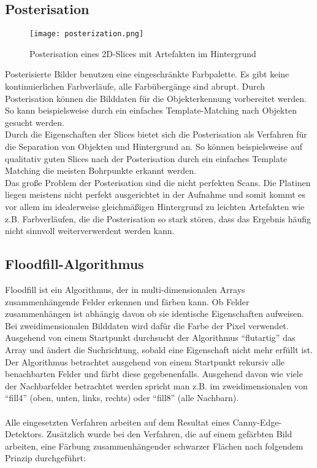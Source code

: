 \subsection {Posterisation}
\begin{figure}[H]
  \begin{center}
    \texttt{[image: posterization.png]}
    \caption{Posterisation eines 2D-Slices mit Artefakten im Hintergrund}
    \label{fig:posterization1}
  \end{center}
\end{figure}

Posterisierte Bilder benutzen eine eingeschränkte Farbpalette. Es gibt keine kontinuierlichen Farbverläufe, alle Farbübergänge sind abrupt. Durch Posterisation können die Bilddaten für die Objekterkennung vorbereitet werden. So kann beispielsweise durch ein einfaches Template-Matching nach Objekten gesucht werden. \\
Durch die Eigenschaften der Slices bietet sich die Posterisation als Verfahren für die Separation von Objekten und Hintergrund an. So können beispielsweise auf qualitativ guten Slices nach der Posterisation durch ein einfaches Template Matching die meisten Bohrpunkte erkannt werden. \\
Das große Problem der Posterisation sind die nicht perfekten Scans. Die Platinen liegen meistens nicht perfekt ausgerichtet in der Aufnahme und somit kommt es vor allem im idealerweise gleichmäßigen Hintergrund zu leichten Artefakten wie z.B. Farbverläufen, die die Posterisation so stark stören, dass das Ergebnis häufig nicht sinnvoll weiterverwerdent werden kann.

	\subsection {Floodfill-Algorithmus}
Floodfill ist ein Algorithmus, der in multi-dimensionalen Arrays zusammenhängende Felder erkennen und färben kann. Ob Felder zusammenhängen ist abhängig davon ob sie identische Eigenschaften aufweisen. Bei zweidimensionalen Bilddaten wird dafür die Farbe der Pixel verwendet. Ausgehend von einem Startpunkt durchsucht der Algorithmus “flutartig” das Array und ändert die Suchrichtung, sobald eine Eigenschaft nicht mehr erfüllt ist. \\
Der Algorithmus betrachtet ausgehend von einem Startpunkt rekursiv alle benachbarten Felder und färbt diese gegebenenfalls. Ausgehend davon wie viele der Nachbarfelder betrachtet werden spricht man z.B. im zweidimensionalen von “fill4” (oben, unten, links, rechts) oder “fill8” (alle Nachbarn). \\ \\
Alle eingesetzten Verfahren arbeiten auf dem Resultat eines Canny-Edge-Detektors. Zusätzlich wurde bei den Verfahren, die auf einem gefärbten Bild arbeiten, eine Färbung zusammenhängender schwarzer Flächen nach folgendem Prinzip durchgeführt: \\

